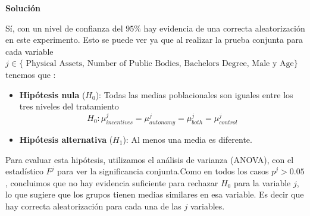 \documentclass[a4paper, answers, addpoints, 11pt]{exam}
\newenvironment{solucion}{%
  \begin{mdframed}[
    backgroundcolor=blue!5,    %
    linecolor=blue!50,          %
    linewidth=2pt,              %
    leftmargin=10pt,            %
    rightmargin=8pt,           %
    topline=true,              %
    bottomline=true,            %
    roundcorner=10pt,           %
    innerleftmargin=10pt,       %
    innerrightmargin=10pt,      %
    innerbottommargin=10pt,     %
    innertopmargin=10pt         %
  ]%
  \begin{tcolorbox}[colframe=blue!50!black, colback=blue!50, coltitle=white, sharp corners=all, boxrule=1mm, width=\textwidth, halign=left, valign=center, top=0mm, bottom=0mm, left=0mm, right=0mm] \textbf{Solución} \end{tcolorbox} }{\end{mdframed}}
\begin{document}
\begin{enumerate}
\begin{enumerate}
\begin{solucion}
\begin{table}[H]
\end{table}
   Sí, con un nivel de confianza del $95\%$ hay evidencia de una correcta aleatorización en este experimento. Esto se puede ver ya que al realizar la prueba conjunta para cada variable $j\in \{\text{ Physical Assets, Number of Public Bodies, Bachelors Degree, Male y Age} \} $ tenemos que :
           

            

         


\begin{itemize}
    \item \textbf{Hipótesis nula} (\(H_0\)): Todas las medias poblacionales son iguales entre los tres niveles del tratamiento
    \[
    H_0: \mu_{incentives}^j = \mu_{autonomy}^j  = \mu_{both}^j = \mu_{control}^j
    \]
   
    
    \item \textbf{Hipótesis alternativa} (\(H_1\)): Al menos una media es diferente.
 
\end{itemize}


Para evaluar esta hipótesis, utilizamos el análisis de varianza (ANOVA), con el estadístico $F^j$ para ver la significancia conjunta.Como en todos los casos \( p^j > 0.05 \), concluimos que no hay evidencia suficiente para rechazar \( H_0 \) para la variable \( j \), lo que sugiere que los grupos tienen medias similares en esa variable. Es decir que hay correcta aleatorización para cada una de las \( j \) variables. 

        \end{solucion}
    

\end{enumerate}
\end{enumerate}
\end{document}

